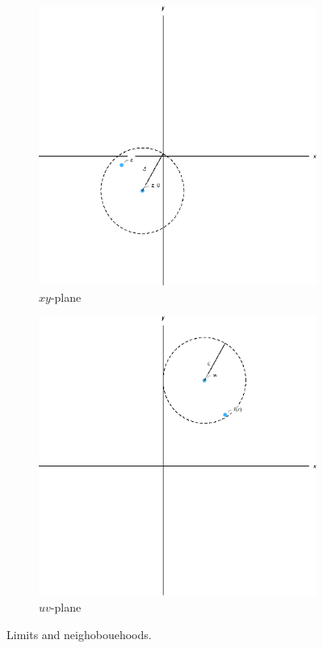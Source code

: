 \documentclass[12pt]{book}
\begin{document}
\begin{figure}[H]
    \centering
    \begin{subfigure}{0.45\textwidth}
        \centering
        \includegraphics[width = \textwidth]{./figs/chapter_1/limits_def_2.eps}
        \caption{$xy$-plane}
    \end{subfigure}
    \qquad
    \begin{subfigure}{0.45\textwidth}
        \centering
        \includegraphics[width = \textwidth]{./figs/chapter_1/limits_def_1.eps}
        \caption{$uv$-plane}
    \end{subfigure}
    \caption{Limits and neighobouehoods.}
\end{figure}
\end{document}
